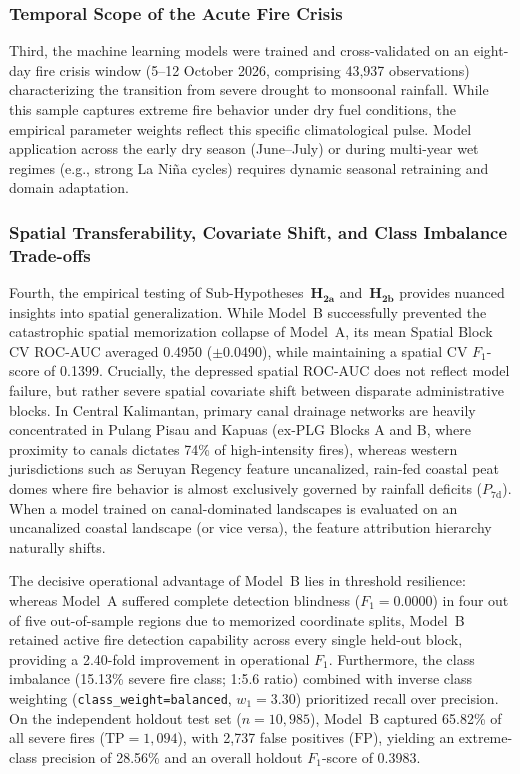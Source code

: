 \subsubsection{Temporal Scope of the Acute Fire Crisis}
Third, the machine learning models were trained and cross-validated on an eight-day fire crisis window (5--12 October 2026, comprising 43,937 observations) characterizing the transition from severe drought to monsoonal rainfall. While this sample captures extreme fire behavior under dry fuel conditions, the empirical parameter weights reflect this specific climatological pulse. Model application across the early dry season (June--July) or during multi-year wet regimes (e.g., strong La Ni\~na cycles) requires dynamic seasonal retraining and domain adaptation.

\subsubsection{Spatial Transferability, Covariate Shift, and Class Imbalance Trade-offs}
Fourth, the empirical testing of Sub-Hypotheses~$\mathbf{H_{2a}}$ and~$\mathbf{H_{2b}}$ provides nuanced insights into spatial generalization. While Model~B successfully prevented the catastrophic spatial memorization collapse of Model~A, its mean Spatial Block CV ROC-AUC averaged 0.4950 ($\pm$0.0490), while maintaining a spatial CV $F_1$-score of 0.1399. Crucially, the depressed spatial ROC-AUC does not reflect model failure, but rather severe spatial covariate shift between disparate administrative blocks. In Central Kalimantan, primary canal drainage networks are heavily concentrated in Pulang Pisau and Kapuas (ex-PLG Blocks A and B, where proximity to canals dictates 74\% of high-intensity fires), whereas western jurisdictions such as Seruyan Regency feature uncanalized, rain-fed coastal peat domes where fire behavior is almost exclusively governed by rainfall deficits ($P_{\text{7d}}$). When a model trained on canal-dominated landscapes is evaluated on an uncanalized coastal landscape (or vice versa), the feature attribution hierarchy naturally shifts.

The decisive operational advantage of Model~B lies in threshold resilience: whereas Model~A suffered complete detection blindness ($F_1 = 0.0000$) in four out of five out-of-sample regions due to memorized coordinate splits, Model~B retained active fire detection capability across every single held-out block, providing a 2.40-fold improvement in operational $F_1$. Furthermore, the class imbalance (15.13\% severe fire class; 1:5.6 ratio) combined with inverse class weighting (\texttt{class\_weight=balanced}, $w_1 = 3.30$) prioritized recall over precision. On the independent holdout test set ($n = 10,985$), Model~B captured 65.82\% of all severe fires ($\text{TP} = 1,094$), with 2,737 false positives ($\text{FP}$), yielding an extreme-class precision of 28.56\% and an overall holdout $F_1$-score of 0.3983.

